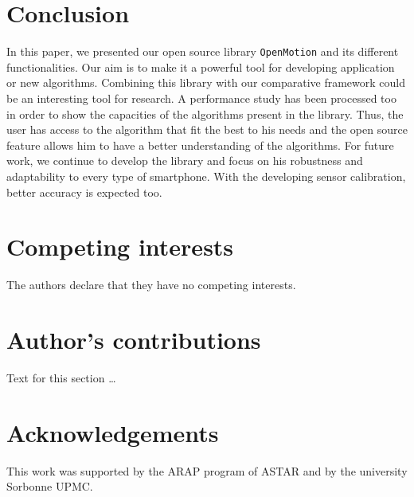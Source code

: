 \section{Conclusion}

In this paper, we presented our open source library \texttt{OpenMotion} and its different functionalities. Our aim is to make it a powerful tool for developing application or new algorithms. Combining this library with our comparative framework \cite{braudcomparison} could be an interesting tool for research. A performance study has been processed too in order to show the capacities of the algorithms present in the library. Thus, the user has access to the algorithm that fit the best to his needs and the open source feature allows him to have a better understanding of the algorithms. For future work, we continue to develop the library and focus on his robustness and adaptability to every type of smartphone. With the developing sensor calibration, better accuracy is expected too. 


\begin{backmatter}

\section*{Competing interests}
  The authors declare that they have no competing interests.

\section*{Author's contributions}
    Text for this section \ldots

\section*{Acknowledgements}
This work was supported by the ARAP program of ASTAR and by the university Sorbonne UPMC.

 
      

\end{backmatter}
